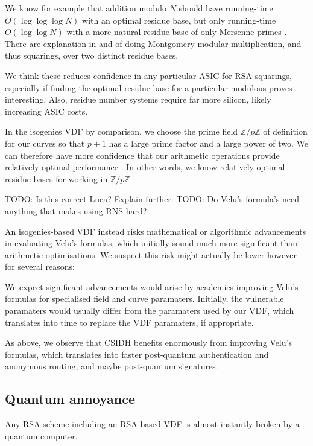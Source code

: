 \documentclass{article}
\newcommand{\Z}{\mathbb{Z}}
\begin{document}
We know for example that addition modulo $N$ should have running-time
$O(\log \log \log N)$ with an optimal residue base, but only
running-time $O(\log \log N)$ with a more natural residue base of only
Mersenne primes \cite[\S4.6]{Parhami}.
There are explanation in \cite{RNSonGPU07} and \cite{Araujo12} of
doing Montgomery modular multiplication, and thus squarings, over
two distinct residue bases. 



We think these reduces confidence in any particular ASIC for RSA
squarings, especially if finding the optimal residue base for a
particular modulous proves interesting.  Also, residue number systems
require far more silicon, likely increasing ASIC costs.

In the isogenies VDF by comparison, we choose the prime field $\Z/p\Z$
of definition for our curves so that $p+1$ has a large prime factor
and a large power of two.  
We can therefore have more confidence that our arithmetic operations
provide relatively optimal performance \cite{????}.  In other words,
we know relatively optimal residue bases for working in $\Z/p\Z$ \cite{????}.

TODO: Is this correct Luca?  Explain further.  
TODO: Do Velu's formula's need anything that makes using RNS hard?

An isogenies-based VDF instead risks mathematical or algorithmic
advancements in evaluating Velu's formulas, which initially sound
much more significant than arithmetic optimisations.  We suspect
this risk might actually be lower however for several reasons:

We expect significant advancements would arise by academics improving
Velu's formulas for specialised field and curve paramaters.
Initially, the vulnerable paramaters would usually differ from the
paramaters used by our VDF, which translates into time to replace
the VDF paramaters, if appropriate.  

As above, we observe that CSIDH \cite{10.1007/978-3-030-03332-3_15} benefits enormously from
improving Velu's formulas, which translates into faster post-quantum
authentication and anonymous routing, and maybe post-quantum signatures.

\subsection{Quantum annoyance}

Any RSA scheme including an RSA based VDF is almost instantly broken
by a quantum computer. 
\end{document}
